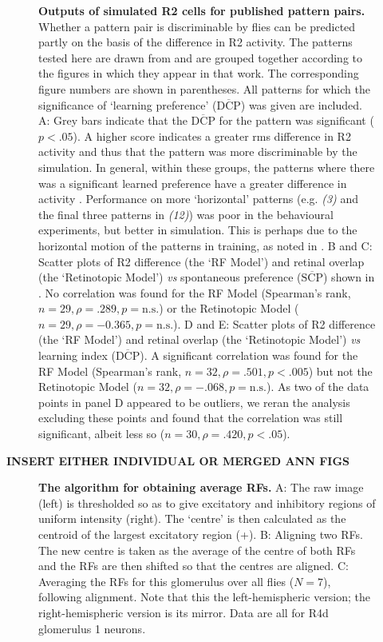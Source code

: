\documentclass[10pt]{article}
\begin{document}
\begin{figure}
	\caption{
		{\bf Outputs of simulated R2 cells for published pattern pairs.}
		Whether a pattern pair is discriminable by flies can be predicted partly on the basis of the difference in R2 activity.
		The patterns tested here are drawn from \protect\cite{Ernst1999} and are grouped together according to the figures in which they appear in that work.
		The corresponding figure numbers are shown in parentheses.
		All patterns for which the significance of `learning preference' ($\overline{\mathrm{DCP}}$) was given are included.
		A: Grey bars indicate that the $\overline{\mathrm{DCP}}$ for the pattern was significant ($p<.05$).
		A higher score indicates a greater \ac{rms} difference in R2 activity and thus that the pattern was more discriminable by the simulation.
		In general, within these groups, the patterns where there was a significant learned preference have a greater difference in activity \protect\cite{Ernst1999}.
		Performance on more `horizontal' patterns (e.g. \emph{(3)} and the final three patterns in \emph{(12)}) was poor in the behavioural experiments, but better in simulation.
		This is perhaps due to the horizontal motion of the patterns in training, as noted in \protect\cite{Ernst1999}.
		B and C: Scatter plots of R2 difference (the `RF Model') and retinal overlap (the `Retinotopic Model') \emph{vs} spontaneous preference ($\overline{\mathrm{SCP}}$) shown in \protect\cite{Ernst1999}.
		No correlation was found for the RF Model (Spearman's rank, $n=29, \rho=.289, p=\mathrm{n.s.}$) or the Retinotopic Model ($n=29, \rho= -0.365, p=\mathrm{n.s.}$).
		D and E: Scatter plots of R2 difference (the `RF Model') and retinal overlap (the `Retinotopic Model') \emph{vs} learning index ($\overline{\mathrm{DCP}}$).
		A significant correlation was found for the RF Model (Spearman's rank, $n=32, \rho=.501, p < .005$) but not the Retinotopic Model ($n=32, \rho=-.068,p=\mathrm{n.s.}$).
		As two of the data points in panel D appeared to be outliers, we reran the analysis excluding these points and found that the correlation was still significant, albeit less so ($n=30, \rho=.420, p < .05$).
		}
	\label{fig:pattern}
\end{figure}

{\bf INSERT EITHER INDIVIDUAL OR MERGED ANN FIGS }

\begin{figure}
	\caption{
		{\bf The algorithm for obtaining average RFs.}
		A: The raw image (left) is thresholded so as to give excitatory and inhibitory regions of uniform intensity (right).
		The `centre' is then calculated as the centroid of the largest excitatory region (+).
		B: Aligning two RFs.
		The new centre is taken as the average of the centre of both RFs and the RFs are then shifted so that the centres are aligned.
		C: Averaging the RFs for this glomerulus over all flies ($N=7$), following alignment.
		Note that this the left-hemispheric version; the right-hemispheric version is its mirror.
		Data are all for R4d glomerulus 1 neurons.
		}
	\label{fig:avkernels}
\end{figure}
\end{document}
